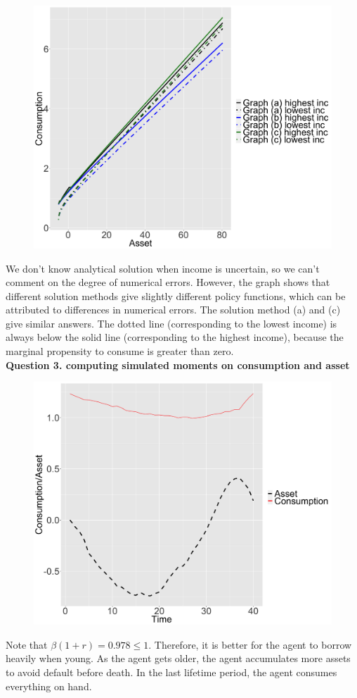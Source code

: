\documentclass[paper=a4, fontsize=13pt]{extarticle} %
\numberwithin{equation}{section} %
\numberwithin{figure}{section} %
\numberwithin{table}{section} %
\begin{document}
\begin{figure}[H]
\centering
\includegraphics[width=0.8\linewidth]{Question2}
\label{fig:question2}
\end{figure}

We don't know analytical solution when income is uncertain, so we can't comment on the degree of numerical errors. However, the graph shows that different solution methods give slightly different policy functions, which can be attributed to differences in numerical errors. The solution method (a) and (c) give similar answers. The dotted line (corresponding to the lowest income) is always below the solid line (corresponding to the highest income), because the marginal propensity to consume is greater than zero. \\

\vspace{0.2in}
\textbf{Question 3. computing simulated moments on consumption and asset} \\
\begin{figure}[H]
\centering
\includegraphics[width=0.7\linewidth]{Question3}
\label{fig:question3}
\end{figure}

Note that $\beta (1+r) =0.978 \leq 1$. Therefore, it is better for the agent to borrow heavily when young. As the agent gets older, the agent accumulates more assets to avoid default before death. In the last lifetime period, the agent consumes everything on hand. \\
\end{document}
